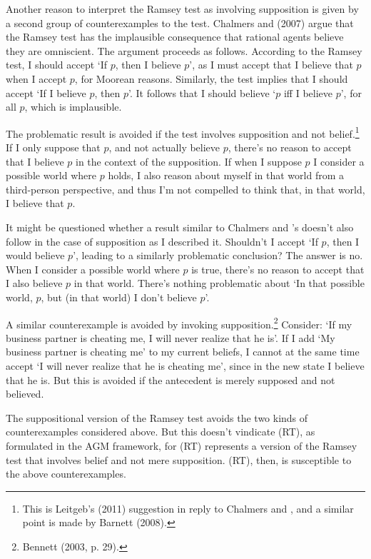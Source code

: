 \documentclass[12pt]{article}
\begin{document}
Another reason to interpret the Ramsey test as involving supposition is given by a second group of counterexamples to the test. Chalmers and \hjk{} (2007) argue that the Ramsey test has the implausible consequence that rational agents believe they are omniscient. The argument proceeds as follows. According to the Ramsey test, I should accept `If $p$, then I believe $p$', as I must accept that I believe that $p$ when I accept $p$, for Moorean reasons. Similarly, the test implies that I should accept `If I believe $p$, then $p$'. It follows that I should believe `$p$ iff I believe $p$', for all $p$, which is implausible.

The problematic result is avoided if the test involves supposition and not belief.\footnote{This is Leitgeb's (2011) suggestion in reply to Chalmers and \hjk{}, and a similar point is made by Barnett (2008).} If I only suppose that $p$, and not actually believe $p$, there's no reason to accept that I believe $p$ in the context of the supposition. If when I suppose $p$ I consider a possible world where $p$ holds, I also reason about myself in that world from a third-person perspective, and thus I'm not compelled to think that, in that world, I believe that $p$.

It might be questioned whether a result similar to Chalmers and \hjk's doesn't also follow in the case of supposition as I described it. Shouldn't I accept `If $p$, then I would believe $p$', leading to a similarly problematic conclusion? The answer is no. When I consider a possible world where $p$ is true, there's no reason to accept that I also believe $p$ in that world. There's nothing problematic about `In that possible world, $p$, but (in that world) I don't believe $p$'. 

A similar counterexample is avoided by invoking supposition.\footnote{Bennett (2003, p. 29).} Consider: `If my business partner is cheating me, I will never realize that he is'. If I add `My business partner is cheating me' to my current beliefs, I cannot at the same time accept `I will never realize that he is cheating me', since in the new state I believe that he is. But this is avoided if the antecedent is merely supposed and not believed.
 
The suppositional version of the Ramsey test avoids the two kinds of counterexamples considered above. But this doesn't vindicate (RT), as formulated in the AGM framework, for (RT) represents a version of the Ramsey test that involves belief and not mere supposition. (RT), then, is susceptible to the above counterexamples.
\end{document}
